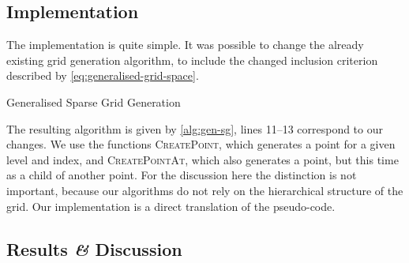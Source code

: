 \subsection{Implementation}
The implementation is quite simple.
It was possible to change the already existing grid generation algorithm, to include the changed inclusion criterion described by \cref{eq:generalised-grid-space}.
\begin{algorithm}[h]
 \caption{Generalised Sparse Grid Generation}\label{alg:gen-sg} 
 \begin{algorithmic}[1]
   \Statex
   \State{} 
   \EndFor
     \State{} 
   \EndFor
   \State{}
   \EndIf
   \State{}
   \EndFor
   \EndWhile
   
   \EndFor
   \EndFor
   \EndFunction
 \end{algorithmic}
\end{algorithm}
The resulting algorithm is given by \cref{alg:gen-sg}, lines 11--13 correspond to our changes.
We use the functions \textsc{CreatePoint}, which generates a point for a given
level and index, and \textsc{CreatePointAt}, which also generates a point, but
this time as a child of another point.
For the discussion here the distinction is not important, because our algorithms do not rely on the hierarchical structure of the grid.
Our implementation is a direct translation of the pseudo-code.
\subsection{Results \textit{\&} Discussion}
\newenvironment{ttable}{
  \begin{tabular}[c]{S[table-format=2.1]
    S[table-format=1.4, table-figures-exponent=2, table-sign-mantissa, table-sign-exponent]
    S[table-format=4.1(4)]
    S[table-format=2.1]
    c
    c
    S[table-format=2.3]
    S[table-format=2.3]}
  \toprule \multicolumn{1}{c}{\(T\)}
& \multicolumn{1}{c}{\(\lambda\)}
& \multicolumn{1}{c}{\textsc{cv}-Grid}
& \multicolumn{1}{c}{\textsc{cv-rmse}}
& \multicolumn{1}{c}{Train-Grid}
& \multicolumn{1}{c}{Train-\textsc{rmse}}
& \multicolumn{1}{r}{Test-\textsc{rmse}}
\\\midrule}{\bottomrule\end{tabular}}

